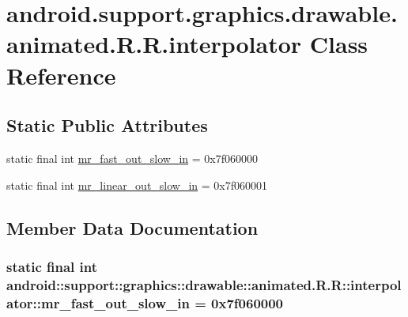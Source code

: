 \hypertarget{classandroid_1_1support_1_1graphics_1_1drawable_1_1animated_1_1_r_1_1interpolator}{
\section{android.support.graphics.drawable.animated.R.R.interpolator Class Reference}
\label{classandroid_1_1support_1_1graphics_1_1drawable_1_1animated_1_1_r_1_1interpolator}
}
\subsection*{Static Public Attributes}
\begin{CompactItemize}
\item 
static final int \hyperlink{classandroid_1_1support_1_1graphics_1_1drawable_1_1animated_1_1_r_1_1interpolator_b601b439f6409f155f84ff22cbacc569}{mr\_\-fast\_\-out\_\-slow\_\-in} = 0x7f060000
\item 
static final int \hyperlink{classandroid_1_1support_1_1graphics_1_1drawable_1_1animated_1_1_r_1_1interpolator_2ebb7db1a5d373c0f2c91970a68a4942}{mr\_\-linear\_\-out\_\-slow\_\-in} = 0x7f060001
\end{CompactItemize}


\subsection{Member Data Documentation}
\hypertarget{classandroid_1_1support_1_1graphics_1_1drawable_1_1animated_1_1_r_1_1interpolator_b601b439f6409f155f84ff22cbacc569}{
\subsubsection[{mr\_\-fast\_\-out\_\-slow\_\-in}]{\setlength{\rightskip}{0pt plus 5cm}static final int android::support::graphics::drawable::animated.R.R::interpolator::mr\_\-fast\_\-out\_\-slow\_\-in = 0x7f060000}}
\label{classandroid_1_1support_1_1graphics_1_1drawable_1_1animated_1_1_r_1_1interpolator_b601b439f6409f155f84ff22cbacc569}


